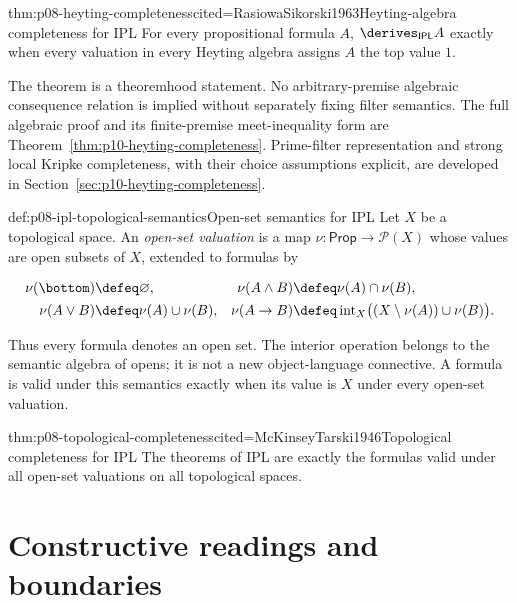 \begin{hbtheorem}{thm:p08-heyting-completeness}{cited=RasiowaSikorski1963}{Heyting-algebra completeness for IPL}
For every propositional formula \(A\),
\(\derives_{\mathsf{IPL}}A\) exactly when every valuation in every Heyting
algebra assigns \(A\) the top value \(1\).
\end{hbtheorem}

The theorem is a theoremhood statement.  No arbitrary-premise algebraic
consequence relation is implied without separately fixing filter semantics.
The full algebraic proof and its finite-premise meet-inequality form
are Theorem~\ref{thm:p10-heyting-completeness}.
Prime-filter representation and strong local Kripke completeness,
with their choice assumptions explicit, are developed in
Section~\ref{sec:p10-heyting-completeness}.

\begin{hbdefinition}{def:p08-ipl-topological-semantics}{Open-set semantics for IPL}
Let \(X\) be a topological space.  An \emph{open-set valuation} is a map
\(\nu:\mathsf{Prop}\to\mathcal P(X)\) whose values are open subsets of
\(X\), extended to formulas by

\[
\begin{aligned}
 \nu(\bottom)&\defeq\varnothing,
 &\nu(A\land B)&\defeq\nu(A)\cap\nu(B),\\
 \nu(A\lor B)&\defeq\nu(A)\cup\nu(B),
 &\nu(A\to B)&\defeq
   \operatorname{int}_{X}
   \bigl((X\setminus\nu(A))\cup\nu(B)\bigr).
\end{aligned}
\]

Thus every formula denotes an open set.  The interior operation belongs to the
semantic algebra of opens; it is not a new object-language connective.  A
formula is valid under this semantics exactly when its value is \(X\) under
every open-set valuation.
\end{hbdefinition}

\begin{hbtheorem}{thm:p08-topological-completeness}{cited=McKinseyTarski1946}{Topological completeness for IPL}
The theorems of IPL are exactly the formulas valid under all open-set
valuations on all topological spaces.
\end{hbtheorem}

\section{Constructive readings and boundaries}

